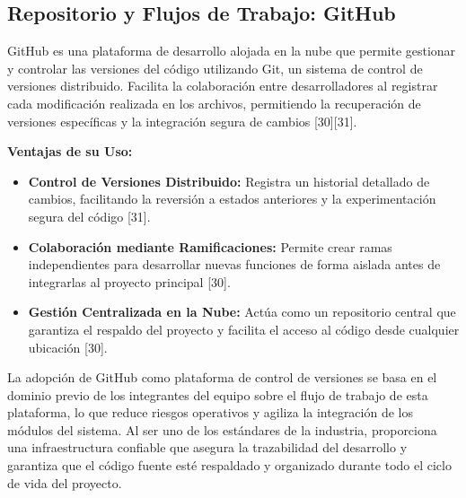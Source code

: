 \subsection{Repositorio y Flujos de Trabajo: GitHub}
GitHub es una plataforma de desarrollo alojada en la nube que permite gestionar y controlar las versiones del código utilizando Git, un sistema de control de versiones distribuido. Facilita la colaboración entre desarrolladores al registrar cada modificación realizada en los archivos, permitiendo la recuperación de versiones específicas y la integración segura de cambios [30][31].

\textbf{Ventajas de su Uso:}
\begin{itemize}
    \item \textbf{Control de Versiones Distribuido:} Registra un historial detallado de cambios, facilitando la reversión a estados anteriores y la experimentación segura del código [31].
    \item \textbf{Colaboración mediante Ramificaciones:} Permite crear ramas independientes para desarrollar nuevas funciones de forma aislada antes de integrarlas al proyecto principal [30].
    \item \textbf{Gestión Centralizada en la Nube:} Actúa como un repositorio central que garantiza el respaldo del proyecto y facilita el acceso al código desde cualquier ubicación [30].
\end{itemize}

La adopción de GitHub como plataforma de control de versiones se basa en el dominio previo de los integrantes del equipo sobre el flujo de trabajo de esta plataforma, lo que reduce riesgos operativos y agiliza la integración de los módulos del sistema. Al ser uno de los estándares de la industria, proporciona una infraestructura confiable que asegura la trazabilidad del desarrollo y garantiza que el código fuente esté respaldado y organizado durante todo el ciclo de vida del proyecto.



